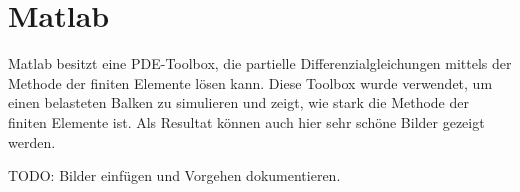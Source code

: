 %
%
%
%
\section{Matlab\label{fem:section:matlab}}

Matlab besitzt eine PDE-Toolbox, die partielle Differenzialgleichungen mittels der Methode der finiten Elemente lösen kann.
Diese Toolbox wurde verwendet, um einen belasteten Balken zu simulieren und zeigt, wie stark die Methode der finiten Elemente ist.
Als Resultat können auch hier sehr schöne Bilder gezeigt werden.

TODO: Bilder einfügen und Vorgehen dokumentieren.